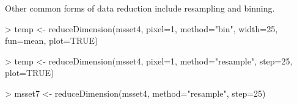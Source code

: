\documentclass[a4paper]{article}
\begin{document}
Other common forms of data reduction include resampling and binning.
\begin{Schunk}
\begin{Sinput}
> temp <- reduceDimension(msset4, pixel=1, method="bin", width=25, fun=mean, plot=TRUE)
\end{Sinput}
\end{Schunk}
\begin{Schunk}
\begin{Sinput}
> temp <- reduceDimension(msset4, pixel=1, method="resample", step=25, plot=TRUE)
\end{Sinput}
\end{Schunk}
\begin{Schunk}
\begin{Sinput}
> msset7 <- reduceDimension(msset4, method="resample", step=25)
\end{Sinput}
\end{Schunk}
\end{document}
